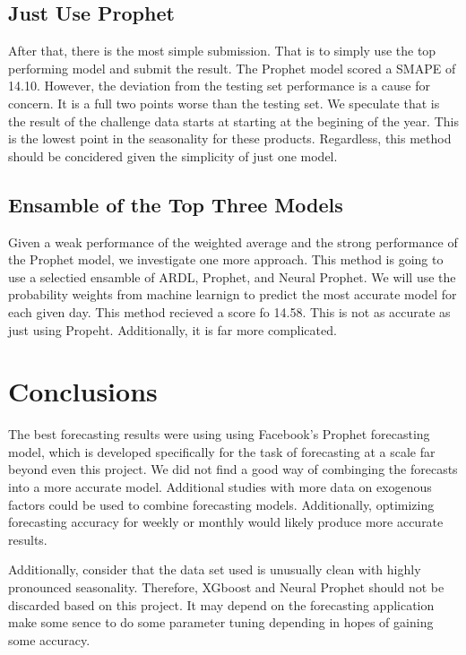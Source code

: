 \documentclass[16pt,twocolumn,letterpaper]{article}
\begin{document}
\subsection{Just Use Prophet}

After that, there is the most simple submission. That is to simply use the top performing model and submit the result. The Prophet model scored a SMAPE of 14.10. However, the deviation from the testing set performance is a cause for concern. It is a full two points worse than the testing set. We speculate that is the result of the challenge data starts at starting at the begining of the year. This is the lowest point in the seasonality for these products. Regardless, this method should be concidered given the simplicity of just one model. 

\subsection{Ensamble of the Top Three Models}

Given a weak performance of the weighted average and the strong performance of the Prophet model, we investigate one more approach. This method is going to use a selectied ensamble of ARDL, Prophet, and Neural Prophet. We will use the probability weights from machine learnign to predict the most accurate model for each given day. This method recieved a score fo 14.58. This is not as accurate as just using Propeht. Additionally, it is far more complicated. 

\section{Conclusions}

The best forecasting results were using using Facebook's Prophet forecasting model, which is developed specifically for the task of forecasting at a scale far beyond even this project. We did not find a good way of combinging the forecasts into a more accurate model. Additional studies with more data on exogenous factors could be used to combine forecasting models. Additionally, optimizing forecasting accuracy for weekly or monthly would likely produce more accurate results. 


Additionally, consider that the data set used is unusually clean with highly pronounced seasonality. Therefore, XGboost and Neural Prophet should not be discarded based on this project. It may depend on the forecasting application make some sence to do some parameter tuning depending in hopes of gaining some accuracy.


\clearpage
\onecolumn


\end{document}
